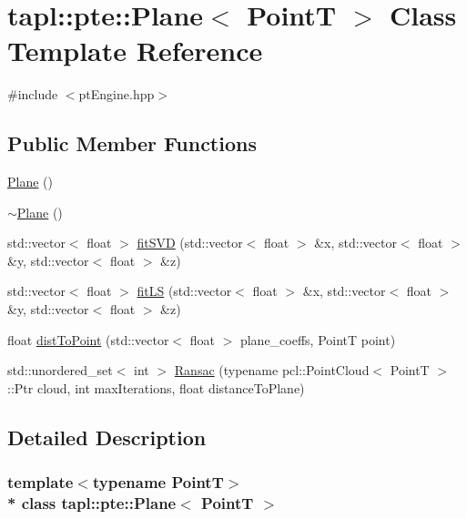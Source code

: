 \hypertarget{classtapl_1_1pte_1_1Plane}{}\section{tapl\+:\+:pte\+:\+:Plane$<$ PointT $>$ Class Template Reference}
\label{classtapl_1_1pte_1_1Plane}


{\ttfamily \#include $<$pt\+Engine.\+hpp$>$}

\subsection*{Public Member Functions}
\begin{DoxyCompactItemize}
\item 
\hyperlink{classtapl_1_1pte_1_1Plane_afab4f82143c003d0311b04c7d412d40c}{Plane} ()
\item 
\hyperlink{classtapl_1_1pte_1_1Plane_a9227e27649697d2d54f21f2cd8e4d6dd}{$\sim$\+Plane} ()
\item 
std\+::vector$<$ float $>$ \hyperlink{classtapl_1_1pte_1_1Plane_a3e0c52b8169fd9edf4c5bbb816432348}{fit\+S\+VD} (std\+::vector$<$ float $>$ \&x, std\+::vector$<$ float $>$ \&y, std\+::vector$<$ float $>$ \&z)
\item 
std\+::vector$<$ float $>$ \hyperlink{classtapl_1_1pte_1_1Plane_a1f943f3b0304c91e86a75a11579dee95}{fit\+LS} (std\+::vector$<$ float $>$ \&x, std\+::vector$<$ float $>$ \&y, std\+::vector$<$ float $>$ \&z)
\item 
float \hyperlink{classtapl_1_1pte_1_1Plane_af3adadd3b24d6c6a5750186e1828b26f}{dist\+To\+Point} (std\+::vector$<$ float $>$ plane\+\_\+coeffs, PointT point)
\item 
std\+::unordered\+\_\+set$<$ int $>$ \hyperlink{classtapl_1_1pte_1_1Plane_ad56c96d9b115a8a482e851c8139feb97}{Ransac} (typename pcl\+::\+Point\+Cloud$<$ PointT $>$\+::Ptr cloud, int max\+Iterations, float distance\+To\+Plane)
\end{DoxyCompactItemize}


\subsection{Detailed Description}
\subsubsection*{template$<$typename PointT$>$\\*
class tapl\+::pte\+::\+Plane$<$ Point\+T $>$}



